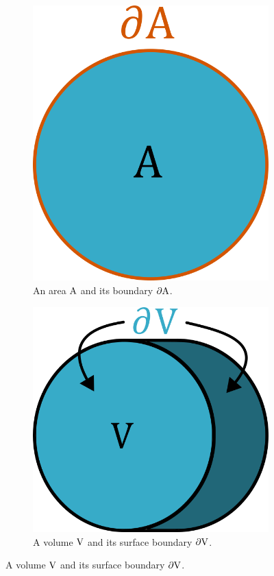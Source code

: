 \begin{figure}
    \centering
    \begin{subfigure}[b]{0.4\textwidth}
        \centering
        \includegraphics[width=\textwidth]{figs/partialA}
        \caption{An area $\mathrm{A}$ and its boundary $\partial \mathrm{A}$.}
        \label{fig:partialA}
    \end{subfigure}
    \hfill
    \begin{subfigure}[b]{0.4\textwidth}
        \centering
        \includegraphics[width=\textwidth]{figs/partialV}
        \caption{A volume $\mathrm{V}$ and its surface boundary $\partial \mathrm{V}$.}
        \label{fig:partialV}
    \end{subfigure}
\end{figure}


